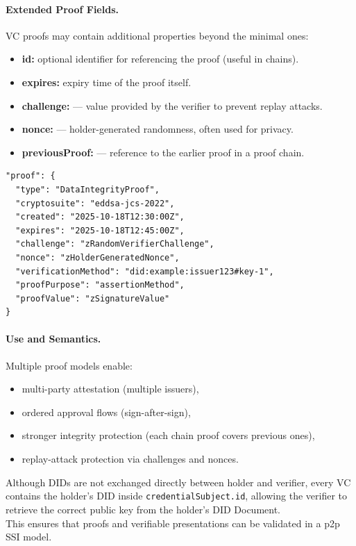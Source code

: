 \paragraph{Extended Proof Fields.}
VC proofs may contain additional properties beyond the minimal ones:
\begin{itemize}
    \item \textbf{id:} optional identifier for referencing the proof (useful in chains).
    \item \textbf{expires:} expiry time of the proof itself.
    \item \textbf{challenge:} — value provided by the verifier to prevent replay attacks.
    \item \textbf{nonce:} — holder-generated randomness, often used for privacy.
    \item \textbf{previousProof:} — reference to the earlier proof in a proof chain.
\end{itemize}

\begin{verbatim}
"proof": {
  "type": "DataIntegrityProof",
  "cryptosuite": "eddsa-jcs-2022",
  "created": "2025-10-18T12:30:00Z",
  "expires": "2025-10-18T12:45:00Z",
  "challenge": "zRandomVerifierChallenge",
  "nonce": "zHolderGeneratedNonce",
  "verificationMethod": "did:example:issuer123#key-1",
  "proofPurpose": "assertionMethod",
  "proofValue": "zSignatureValue"
}
\end{verbatim}

\paragraph{Use and Semantics.}
Multiple proof models enable:
\begin{itemize}
    \item multi-party attestation (multiple issuers),
    \item ordered approval flows (sign-after-sign),
    \item stronger integrity protection (each chain proof covers previous ones),
    \item replay-attack protection via challenges and nonces.
\end{itemize}


\noindent
Although DIDs are not exchanged directly between holder and verifier, every VC contains the holder’s DID inside \texttt{credentialSubject.id}, allowing the verifier to retrieve the correct public key from the holder’s DID Document.  \\
This ensures that proofs and verifiable presentations can be validated in a p2p SSI model.

